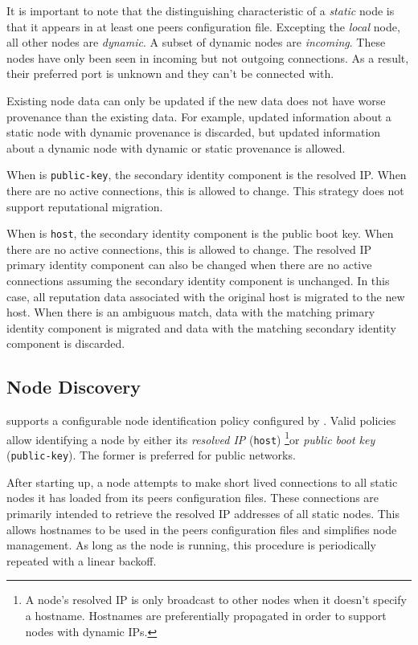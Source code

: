 It is important to note that the distinguishing characteristic of a \emph{static} node is that it appears in at least one peers configuration file.
Excepting the \emph{local} node, all other nodes are \emph{dynamic}.
A subset of dynamic nodes are \emph{incoming}.
These nodes have only been seen in incoming but not outgoing connections.
As a result, their preferred port is unknown and they can't be connected with.

Existing node data can only be updated if the new data does not have worse provenance than the existing data.
For example, updated information about a static node with dynamic provenance is discarded, but updated information about a dynamic node with dynamic or static provenance is allowed.

When  is \texttt{public-key}, the secondary identity component is the resolved IP.
When there are no active connections, this is allowed to change.
This strategy does not support reputational migration.

When  is \texttt{host}, the secondary identity component is the public boot key.
When there are no active connections, this is allowed to change.
The resolved IP primary identity component can also be changed when there are no active connections assuming the secondary identity component is unchanged.
In this case, all reputation data associated with the original host is migrated to the new host.
When there is an ambiguous match, data with the matching primary identity component is migrated and data with the matching secondary identity component is discarded.

\subsection{Node Discovery}
\label{sec:network:discovery}

\codenamespace supports a configurable node identification policy configured by .
Valid policies allow identifying a node by either its \emph{resolved IP} (\texttt{host})
\footnote{
	A node's resolved IP is only broadcast to other nodes when it doesn't specify a hostname.
	Hostnames are preferentially propagated in order to support nodes with dynamic IPs.
}or \emph{public boot key} (\texttt{public-key}).
The former is preferred for public networks.

After starting up, a node attempts to make short lived connections to all static nodes it has loaded from its peers configuration files.
These connections are primarily intended to retrieve the resolved IP addresses of all static nodes.
This allows hostnames to be used in the peers configuration files and simplifies node management.
As long as the node is running, this procedure is periodically repeated with a linear backoff.

